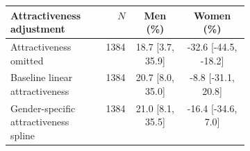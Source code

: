 \begin{tabular}{p{0.40\linewidth}rcc}
\toprule
Attractiveness adjustment & $N$ & Men (\%) & Women (\%) \\
\midrule
Attractiveness omitted & 1384 & 18.7 [3.7, 35.9] & -32.6 [-44.5, -18.2] \\
Baseline linear attractiveness & 1384 & 20.7 [8.0, 35.0] & -8.8 [-31.1, 20.8] \\
Gender-specific attractiveness spline & 1384 & 21.0 [8.1, 35.5] & -16.4 [-34.6, 7.0] \\
\bottomrule
\end{tabular}
